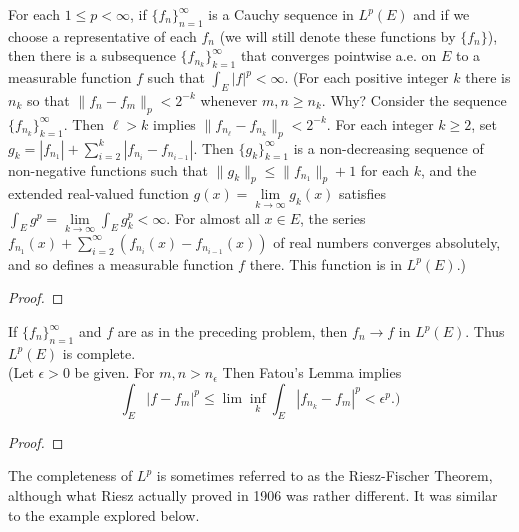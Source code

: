 \begin{pblm}%
	For each $1\le p < \infty$, if $\{f_n\}_{n=1}^\infty$ is a Cauchy sequence in $L^p(E)$ and 
	if we choose a representative of each $f_n$ (we will still denote these functions by $\{f_n\}$), 
	then there is a subsequence $\{f_{n_k}\}_{k=1}^\infty$ that converges pointwise a.e. on $E$ to 
	a measurable function $f$ such that $\int_E|f|^p < \infty$. (For each positive integer $k$ there 
	is $n_k$ so that $\|f_n - f_m\|_p < 2^{-k}$ whenever $m,n \ge n_k$. Why? Consider the sequence 
	$\{f_{n_k}\}_{k=1}^\infty$. Then $\ell > k$ implies $\|f_{n_\ell} - f_{n_k}\|_p < 2^{-k}$. 
	For each integer $k \ge 2$, set $g_k = |f_{n_1}| + \sum\limits_{i=2}^k|f_{n_i} - f_{n_{i-1}}|$. 
	Then $\{g_k\}_{k=1}^\infty$ is a non-decreasing sequence of non-negative functions such that 
	$\|g_k\|_p \le \|f_{n_1}\|_p + 1$ for each $k$, and the extended real-valued function 
	$g(x) = \lim\limits_{k\to\infty}g_k(x)$ satisfies $\int_Eg^p = \lim\limits_{k\to\infty}\int_Eg^p_k < \infty$. 
	For almost all $x \in E$, the series $f_{n_1}(x) + \sum\limits_{i=2}^\infty (f_{n_i}(x) - f_{n_{i-1}}(x))$ 
	of real numbers converges absolutely, and so defines a measurable  function $f$ there. This 
	function is in $L^p(E)$.)
\begin{proof}
\end{proof}
\end{pblm}

\begin{pblm}%
	If $\{f_n\}_{n=1}^\infty$ and $f$ are as in the preceding problem, then $f_n \rightarrow f$ in 
	$L^p(E)$. Thus $L^p(E)$ is complete.\\
	{\scriptsize{(Let $\epsilon > 0$ be given. For $m,n > n_\epsilon$ Then Fatou's Lemma implies 
	\begin{equation*}
		\int_E|f-f_m|^p \le \lim\inf\limits_{k}\int_E|f_{n_k} - f_m|^p < \epsilon^p.)
	\end{equation*}
	}}
\begin{proof}
\end{proof}
\end{pblm}

\begin{rmk}%
	The completeness of $L^p$ is sometimes referred to as the Riesz-Fischer Theorem, although 
	what Riesz actually proved in 1906 was rather different. It was similar to the example 
	explored below. 
\end{rmk}

